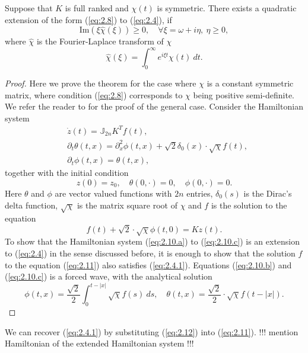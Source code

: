 \begin{theorem}
Suppose that $K$ is full ranked and $\chi(t)$ is symmetric. There exists a quadratic extension of the form (\ref{eq:2.8}) to (\ref{eq:2.4}), if
\begin{equation} \label{eq:2.8}
	\text{Im}(\xi\hat{\chi}(\xi)) \geq 0, \quad \forall \xi = \omega + i\eta, \ \eta \geq 0,
\end{equation}
where $\hat{\chi}$ is the Fourier-Laplace transform of $\chi$
\begin{equation} \label{eq:2.9}
	\hat{\chi}(\xi) = \int_0^\infty e^{i\xi t} \chi(t)\ dt.
\end{equation}
\end{theorem}

\begin{proof}
Here we prove the theorem for the case where $\chi$ is a constant symmetric matrix, where condition (\ref{eq:2.8}) corresponds to $\chi$ being positive semi-definite. We refer the reader to \cite{Figotin:2006jy} for the proof of the general case. Consider the Hamiltonian system
\begin{subequations}
\begin{align}
		\label{eq:2.10.a} & \dot{z}(t) = \mathbb J_{2n} K^T f(t), \\
		\label{eq:2.10.b} & \partial_t \theta(t,x) = \partial_x^2 \phi(t,x) + \sqrt 2 \delta_0(x) \cdot \sqrt{\chi}  f(t), \\
		\label{eq:2.10.c} & \partial_t \phi(t,x) = \theta(t,x),
\end{align}
\end{subequations}
together with the initial condition
\begin{equation} \label{eq:2.10.1}
	z(0) = z_0,\quad \theta(0,\cdot) = 0, \quad \phi(0,\cdot) = 0.
\end{equation}
Here $\theta$ and $\phi$ are vector valued functions with $2n$ entries, $\delta_0(s)$ is the Dirac's delta function, $\sqrt{ \chi}$ is the matrix square root of $\chi$ and $f$ is the solution to the equation
\begin{equation} \label{eq:2.11}
	f(t) + \sqrt{2} \cdot \sqrt{ \chi } \phi(t,0) = Kz(t).
\end{equation}
To show that the Hamiltonian system (\ref{eq:2.10.a}) to (\ref{eq:2.10.c}) is an extension to (\ref{eq:2.4}) in the sense discussed before, it is enough to show that the solution $f$ to the equation (\ref{eq:2.11}) also satisfies (\ref{eq:2.4.1}). Equations (\ref{eq:2.10.b}) and (\ref{eq:2.10.c}) is a forced wave, with the analytical solution
\begin{equation} \label{eq:2.12}
	\phi(t,x) = \frac {\sqrt 2} 2 \int_0^{t-|x|} \sqrt{\chi} f(s)\ ds,\quad \theta(t,x) = \frac{\sqrt 2}{2} \cdot \sqrt{\chi} f(t - |x|).
\end{equation}
\end{proof}
We can recover (\ref{eq:2.4.1}) by substituting (\ref{eq:2.12}) into (\ref{eq:2.11}). {!!! mention Hamiltonian of the extended Hamiltonian system !!!} 
